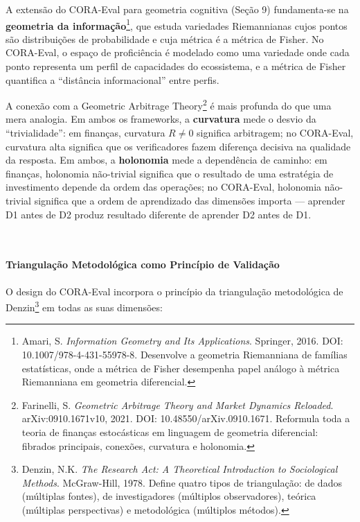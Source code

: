 A extensão do CORA-Eval para geometria cognitiva (Seção 9) fundamenta-se na
\textbf{geometria da informação}\footnote{Amari, S. \textit{Information
Geometry and Its Applications}. Springer, 2016. DOI:
10.1007/978-4-431-55978-8. Desenvolve a geometria Riemanniana de famílias
estatísticas, onde a métrica de Fisher desempenha papel análogo à métrica
Riemanniana em geometria diferencial.}, que estuda variedades Riemannianas
cujos pontos são distribuições de probabilidade e cuja métrica é a métrica
de Fisher. No CORA-Eval, o espaço de proficiência é modelado como uma
variedade onde cada ponto representa um perfil de capacidades do ecossistema,
e a métrica de Fisher quantifica a ``distância informacional'' entre perfis.

A conexão com a Geometric Arbitrage Theory\footnote{Farinelli, S.
\textit{Geometric Arbitrage Theory and Market Dynamics Reloaded}.
arXiv:0910.1671v10, 2021. DOI: 10.48550/arXiv.0910.1671. Reformula toda a
teoria de finanças estocásticas em linguagem de geometria diferencial: fibrados
principais, conexões, curvatura e holonomia.} é mais profunda do que uma
mera analogia. Em ambos os frameworks, a \textbf{curvatura} mede o desvio
da ``trivialidade'': em finanças, curvatura $R \neq 0$ significa arbitragem;
no CORA-Eval, curvatura alta significa que os verificadores fazem diferença
decisiva na qualidade da resposta. Em ambos, a \textbf{holonomia} mede a
dependência de caminho: em finanças, holonomia não-trivial significa que o
resultado de uma estratégia de investimento depende da ordem das operações;
no CORA-Eval, holonomia não-trivial significa que a ordem de aprendizado das
dimensões importa — aprender D1 antes de D2 produz resultado diferente de
aprender D2 antes de D1.

\\\paragraph{Triangulação Metodológica como Princípio de Validação}

O design do CORA-Eval incorpora o princípio da triangulação metodológica
de Denzin\footnote{Denzin, N.K. \textit{The Research Act: A Theoretical
Introduction to Sociological Methods}. McGraw-Hill, 1978. Define quatro
tipos de triangulação: de dados (múltiplas fontes), de investigadores
(múltiplos observadores), teórica (múltiplas perspectivas) e metodológica
(múltiplos métodos).} em todas as suas dimensões:


